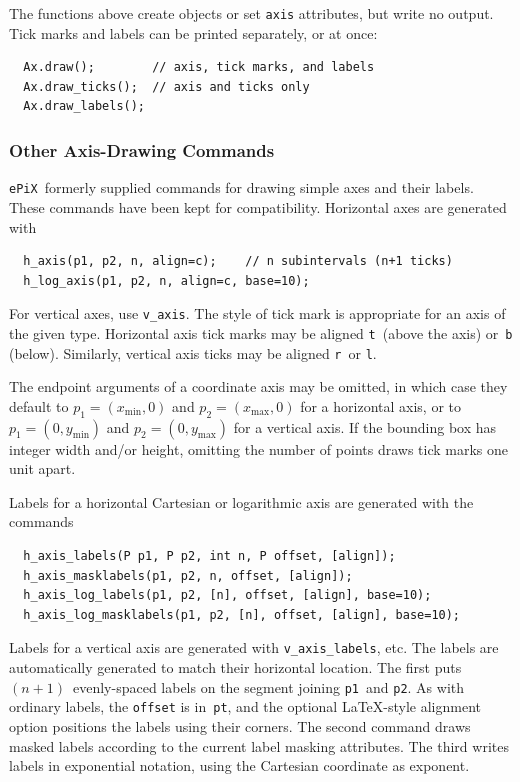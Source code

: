 \documentclass[12pt,letterpaper]{book}
\newcommand{\code}[1]{\texttt{#1}}
\newcommand{\ePiX}{\code{ePiX}}
\newcommand{\teximath}[1]{$#1$}
\newcommand{\findex}[1]{\ignorespaces}
\begin{document}
The functions above create objects or set \code{axis} attributes, but
write no output. Tick marks and labels can be printed separately, or
at once:
\findex{axis.draw}
\findex{axis.draw\_ticks}
\findex{axis.draw\_labels}
\begin{verbatim}
  Ax.draw();        // axis, tick marks, and labels
  Ax.draw_ticks();  // axis and ticks only
  Ax.draw_labels();
\end{verbatim}


\subsubsection*{Other Axis-Drawing Commands}

\ePiX\ formerly supplied commands for drawing simple axes and their
labels. These commands have been kept for compatibility.  Horizontal
axes are generated with
\findex{h\_axis}
\findex{h\_log\_axis}
\findex{v\_axis}
\findex{v\_log\_axis}
\begin{verbatim}
  h_axis(p1, p2, n, align=c);    // n subintervals (n+1 ticks)
  h_log_axis(p1, p2, n, align=c, base=10);
\end{verbatim}
For vertical axes, use \code{v\_axis}.  The style of tick mark is
appropriate for an axis of the given type.  Horizontal axis tick marks
may be aligned \code{t}~(above the axis) or~\code{b}
(below). Similarly, vertical axis ticks may be aligned \code{r}~or
\code{l}.

The endpoint arguments of a coordinate axis may be omitted, in which
case they default to \teximath{p_1=(x_\mathrm{min},0)} and
\teximath{p_2=(x_\mathrm{max},0)} for a horizontal axis, or to
\teximath{p_1=(0,y_\mathrm{min})} and
\teximath{p_2=(0,y_\mathrm{max})} for a vertical axis. If the bounding
box has integer width and/or height, omitting the number of points
draws tick marks one unit apart.

Labels for a horizontal Cartesian or logarithmic axis are generated
with the commands
\findex{h\_axis\_labels}
\findex{h\_axis\_masklabels}
\findex{h\_axis\_log\_labels}
\findex{h\_axis\_log\_masklabels}
\findex{v\_axis\_labels}
\findex{v\_axis\_masklabels}
\findex{v\_axis\_log\_labels}
\findex{v\_axis\_log\_masklabels}
\begin{verbatim}
  h_axis_labels(P p1, P p2, int n, P offset, [align]);
  h_axis_masklabels(p1, p2, n, offset, [align]);
  h_axis_log_labels(p1, p2, [n], offset, [align], base=10);
  h_axis_log_masklabels(p1, p2, [n], offset, [align], base=10);
\end{verbatim}
Labels for a vertical axis are generated with \code{v\_axis\_labels},
etc. The labels are automatically generated to match their horizontal
location.  The first puts \teximath{(n+1)}~evenly-spaced labels on the segment
joining \code{p1}~and \code{p2}. As with ordinary labels, the
\code{offset} is in~\code{pt}, and the optional \LaTeX-style alignment
option positions the labels using their corners.  The second command
draws masked labels according to the current label masking
attributes. The third writes labels in exponential notation, using the
Cartesian coordinate as exponent.
\end{document}
